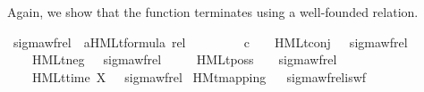 \begin{isabellebody}
\endisatagproof
{\isafoldproof}%
%
\isadelimproof
%
\endisadelimproof
%
\begin{isamarkuptext}%
Again, we show that the function terminates using a well-founded relation.%
\end{isamarkuptext}\isamarkuptrue%
\isamarkupfalse%
\ sigma{\isacharunderscore}{\kern0pt}wf{\isacharunderscore}{\kern0pt}rel\ {\isacharcolon}{\kern0pt}{\isacharcolon}{\kern0pt}\ {\isacartoucheopen}{\isacharparenleft}{\kern0pt}{\isacharparenleft}{\kern0pt}{\isacharprime}{\kern0pt}a{\isacharparenright}{\kern0pt}HMLt{\isacharunderscore}{\kern0pt}formula{\isacharparenright}{\kern0pt}\ rel{\isacartoucheclose}\ \isanewline
\ \ \isanewline
\ \ \ \ {\isacartoucheopen}{\isasymphi}\ {\isasymin}\isactrlsub c\ {\isasymPhi}\ {\isasymLongrightarrow}\ {\isacharparenleft}{\kern0pt}{\isasymphi}{\isacharcomma}{\kern0pt}\ HMLt{\isacharunderscore}{\kern0pt}conj\ {\isasymPhi}{\isacharparenright}{\kern0pt}\ {\isasymin}\ sigma{\isacharunderscore}{\kern0pt}wf{\isacharunderscore}{\kern0pt}rel{\isacartoucheclose}\ \isanewline
\ \ {\isacharbar}{\kern0pt}\ {\isacartoucheopen}{\isacharparenleft}{\kern0pt}{\isasymphi}{\isacharcomma}{\kern0pt}\ HMLt{\isacharunderscore}{\kern0pt}neg\ {\isasymphi}{\isacharparenright}{\kern0pt}\ {\isasymin}\ sigma{\isacharunderscore}{\kern0pt}wf{\isacharunderscore}{\kern0pt}rel{\isacartoucheclose}\ \isanewline
\ \ {\isacharbar}{\kern0pt}\ {\isacartoucheopen}{\isacharparenleft}{\kern0pt}{\isasymphi}{\isacharcomma}{\kern0pt}\ HMLt{\isacharunderscore}{\kern0pt}poss\ {\isasymalpha}\ {\isasymphi}{\isacharparenright}{\kern0pt}\ {\isasymin}\ sigma{\isacharunderscore}{\kern0pt}wf{\isacharunderscore}{\kern0pt}rel{\isacartoucheclose}\ \isanewline
\ \ {\isacharbar}{\kern0pt}\ {\isacartoucheopen}{\isacharparenleft}{\kern0pt}{\isasymphi}{\isacharcomma}{\kern0pt}\ HMLt{\isacharunderscore}{\kern0pt}time\ X\ {\isasymphi}{\isacharparenright}{\kern0pt}\ {\isasymin}\ sigma{\isacharunderscore}{\kern0pt}wf{\isacharunderscore}{\kern0pt}rel{\isacartoucheclose}\isanewline
%
\isadelimunimportant
%
\endisadelimunimportant
%
\isatagunimportant
%
\endisatagunimportant
{\isafoldunimportant}%
%
\isadelimunimportant
\isanewline
%
\endisadelimunimportant
\isanewline
{}\isamarkupfalse%
\ HMt{\isacharunderscore}{\kern0pt}mapping%
\isadelimproof
\ %
\endisadelimproof
%
\isatagproof
{}\isamarkupfalse%
\ sigma{\isacharunderscore}{\kern0pt}wf{\isacharunderscore}{\kern0pt}rel{\isacharunderscore}{\kern0pt}is{\isacharunderscore}{\kern0pt}wf\ \isamarkupfalse%

\end{isabellebody}

